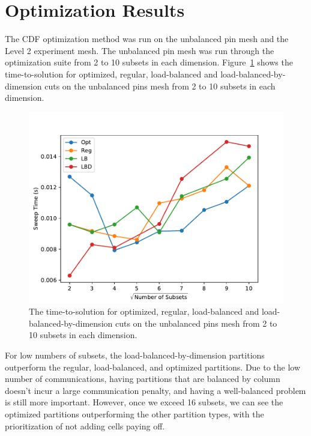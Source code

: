 \section{Optimization Results}
The CDF optimization method was run on the unbalanced pin mesh and the Level 2 experiment mesh.
The unbalanced pin mesh was run through the optimization suite from 2 to 10 subsets in each dimension.
Figure~\ref{ubp_opt} shows the time-to-solution for optimized, regular, load-balanced and load-balanced-by-dimension cuts on the unbalanced pins mesh from 2 to 10 subsets in each dimension.
\begin{figure}[ht]
\centering
  \includegraphics{../../figures/unbalanced_pins_opt_comparison.pdf}
  \caption{The time-to-solution for optimized, regular, load-balanced and load-balanced-by-dimension cuts on the unbalanced pins mesh from 2 to 10 subsets in each dimension.}
  \label{ubp_opt}
\end{figure}
For low numbers of subsets, the load-balanced-by-dimension partitions outperform the regular, load-balanced, and optimized partitions.
Due to the low number of communications, having partitions that are balanced by column doesn't incur a large communication penalty, and having a well-balanced problem is still more important.
However, once we exceed 16 subsets, we can see the optimized partitions outperforming the other partition types, with the prioritization of not adding cells paying off.


